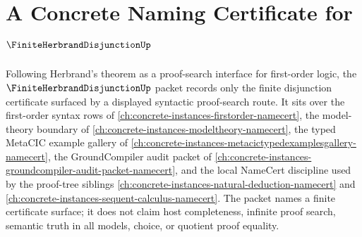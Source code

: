 \chapter{A Concrete Naming Certificate for $\FiniteHerbrandDisjunctionUp$}
\label{ch:concrete-instances-finite-herbrand-disjunction-namecert}

Following Herbrand's theorem as a proof-search interface for first-order logic, the $\FiniteHerbrandDisjunctionUp$ packet records only the finite disjunction certificate surfaced by a displayed syntactic proof-search route. It sits over the first-order syntax rows of \autoref{ch:concrete-instances-firstorder-namecert}, the model-theory boundary of \autoref{ch:concrete-instances-modeltheory-namecert}, the typed MetaCIC example gallery of \autoref{ch:concrete-instances-metacictypedexamplesgallery-namecert}, the GroundCompiler audit packet of \autoref{ch:concrete-instances-groundcompiler-audit-packet-namecert}, and the local NameCert discipline used by the proof-tree siblings \autoref{ch:concrete-instances-natural-deduction-namecert} and \autoref{ch:concrete-instances-sequent-calculus-namecert}. The packet names a finite certificate surface; it does not claim host completeness, infinite proof search, semantic truth in all models, choice, or quotient proof equality.

